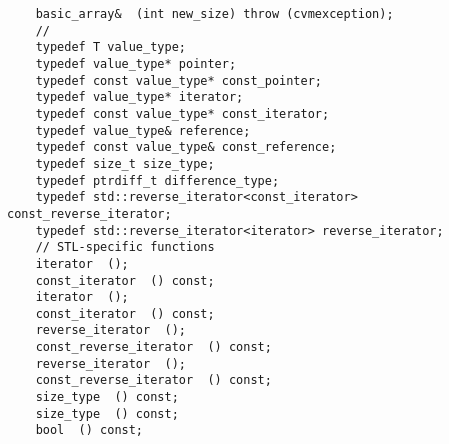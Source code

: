 \verb"    basic_array& "\verb" (int new_size) throw (cvmexception);"\\
\verb"    // "\\
\verb"    typedef T value_type;"\\
\verb"    typedef value_type* pointer;"\\
\verb"    typedef const value_type* const_pointer;"\\
\verb"    typedef value_type* iterator;"\\
\verb"    typedef const value_type* const_iterator;"\\
\verb"    typedef value_type& reference;"\\
\verb"    typedef const value_type& const_reference;"\\
\verb"    typedef size_t size_type;"\\
\verb"    typedef ptrdiff_t difference_type;"\\
\verb"    typedef std::reverse_iterator<const_iterator> const_reverse_iterator;"\\
\verb"    typedef std::reverse_iterator<iterator> reverse_iterator;"\\
\verb"    // STL-specific functions"\\
\verb"    iterator "\verb" ();"\\
\verb"    const_iterator "\verb" () const;"\\
\verb"    iterator "\verb" ();"\\
\verb"    const_iterator "\verb" () const;"\\
\verb"    reverse_iterator "\verb" ();"\\
\verb"    const_reverse_iterator "\verb" () const;"\\
\verb"    reverse_iterator "\verb" ();"\\
\verb"    const_reverse_iterator "\verb" () const;"\\
\verb"    size_type "\verb" () const;"\\
\verb"    size_type "\verb" () const;"\\
\verb"    bool "\verb" () const;"\\
